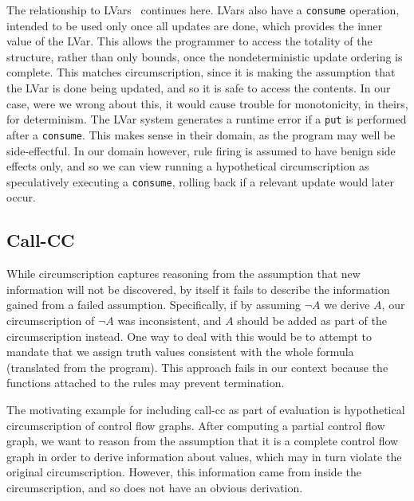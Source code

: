 The relationship to LVars~\cite{lvar} continues here.
LVars also have a \texttt{consume} operation, intended to be used only once all updates are done, which provides the inner value of the LVar.
This allows the programmer to access the totality of the structure, rather than only bounds, once the nondeterministic update ordering is complete.
This matches circumscription, since it is making the assumption that the LVar is done being updated, and so it is safe to access the contents.
In our case, were we wrong about this, it would cause trouble for monotonicity, in theirs, for determinism.
The LVar system generates a runtime error if a \texttt{put} is performed after a \texttt{consume}.
This makes sense in their domain, as the program may well be side-effectful.
In our domain however, rule firing is assumed to have benign side effects only, and so we can view running a hypothetical circumscription as speculatively executing a \texttt{consume}, rolling back if a relevant update would later occur.

\subsection{Call-CC}
\label{sec:callcc}
While circumscription captures reasoning from the assumption that new information will not be discovered, by itself it fails to describe the information gained from a failed assumption.
Specifically, if by assuming $\neg A$ we derive $A$, our circumscription of $\neg A$ was inconsistent, and $A$ should be added as part of the circumscription instead.
One way to deal with this would be to attempt to mandate that we assign truth values consistent with the whole formula (translated from the program).
This approach fails in our context because the functions attached to the rules may prevent termination.

The motivating example for including call-cc as part of evaluation is hypothetical circumscription of control flow graphs.
After computing a partial control flow graph, we want to reason from the assumption that it is a complete control flow graph in order to derive information about values, which may in turn violate the original circumscription.
However, this information came from inside the circumscription, and so does not have an obvious derivation.

